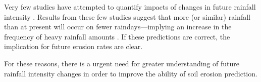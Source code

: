 Very few studies have attempted to quantify impacts of changes in future
rainfall intensity \citep{ipcc2001-1032}. Results from these few studies suggest
that more (or similar) rainfall than at present will occur on fewer
raindays---implying an increase in the frequency of heavy rainfall amounts
\citep{watson1998-517}. If these predictions are correct, the implication for
future erosion rates are clear.

For these reasons, there is a urgent need for greater understanding of future
rainfall intensity changes in order to improve the ability of soil erosion
prediction.






